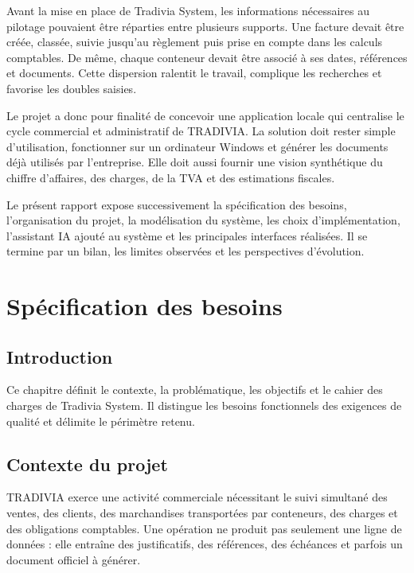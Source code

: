 \documentclass[12pt,a4paper,oneside]{report}
\begin{document}
Avant la mise en place de Tradivia System, les informations nécessaires au pilotage pouvaient être réparties entre plusieurs supports. Une facture devait être créée, classée, suivie jusqu'au règlement puis prise en compte dans les calculs comptables. De même, chaque conteneur devait être associé à ses dates, références et documents. Cette dispersion ralentit le travail, complique les recherches et favorise les doubles saisies.

Le projet a donc pour finalité de concevoir une application locale qui centralise le cycle commercial et administratif de TRADIVIA. La solution doit rester simple d'utilisation, fonctionner sur un ordinateur Windows et générer les documents déjà utilisés par l'entreprise. Elle doit aussi fournir une vision synthétique du chiffre d'affaires, des charges, de la TVA et des estimations fiscales.

Le présent rapport expose successivement la spécification des besoins, l'organisation du projet, la modélisation du système, les choix d'implémentation, l'assistant IA ajouté au système et les principales interfaces réalisées. Il se termine par un bilan, les limites observées et les perspectives d'évolution.





\chapter{Spécification des besoins}
\section*{Introduction}
Ce chapitre définit le contexte, la problématique, les objectifs et le cahier des charges de Tradivia System. Il distingue les besoins fonctionnels des exigences de qualité et délimite le périmètre retenu.

\section{Contexte du projet}
TRADIVIA exerce une activité commerciale nécessitant le suivi simultané des ventes, des clients, des marchandises transportées par conteneurs, des charges et des obligations comptables. Une opération ne produit pas seulement une ligne de données : elle entraîne des justificatifs, des références, des échéances et parfois un document officiel à générer.
\end{document}

